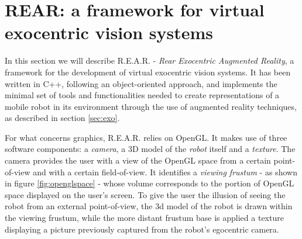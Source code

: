 \section{\textsf{REAR:} a framework for virtual exocentric vision systems}
\label{sec:rear}

In this section we will describe \textsf{R.E.A.R.} - 
\textit{Rear Exocentric Augmented Reality}, a framework 
for the development of virtual exocentric vision systems.
%
It has been written in C++, following an object-oriented 
approach, and implements the minimal set of tools and functionalities 
needed to create representations of a mobile robot in its environment 
through the use of augmented reality techniques, as described in 
section \ref{sec:exo}.
%

%
For what concerns graphics, \textsf{R.E.A.R.} relies on OpenGL.
It makes use of three software components: a \textit{camera}, 
a 3D model of the \textit{robot} itself and a \textit{texture}.
%
The camera provides the user with a view of the OpenGL space 
from a certain point-of-view and with a certain field-of-view. 
It identifies a \textit{viewing frustum} - as shown in figure 
\ref{fig:openglspace} - whose volume corresponds to the 
portion of OpenGL space displayed on the user's screen.
%
To give the user the illusion of seeing the robot from an 
external point-of-view, the 3d model of the robot is drawn 
within the viewing frustum, while the more distant frustum base 
is applied a texture displaying a picture previously 
captured from the robot's egocentric camera.
%

